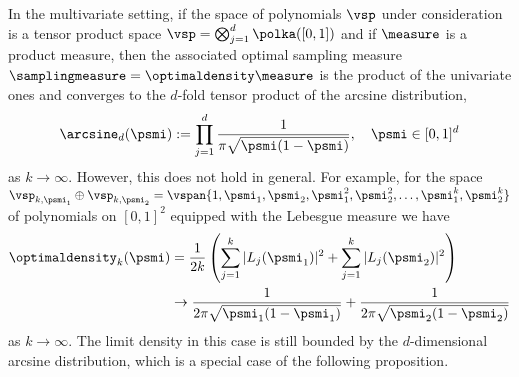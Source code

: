 In the multivariate setting, if the space of polynomials $\vsp$ under consideration is a tensor product space $\vsp=\bigotimes_{j=1}^{d}\polka([0,1])$ and if $\measure$ is a product measure, then the associated optimal sampling measure $\samplingmeasure=\optimaldensity\measure$ is the product of the univariate ones and converges to the $d$-fold tensor product of the arcsine distribution,
 \begin{equation*}
 \arcsine_{d}(\psmi):=\prod_{j=1}^{d}\frac{1}{\pi\sqrt{\psmi(1-\psmi)}},\quad \psmi\in[0,1]^d
 \end{equation*}
 as $k\to\infty$. However, this does not hold in general. For example, for the space $\vsp_{k,\psmi_1}\oplus \vsp_{k,\psmi_2}=\vspan\{1,\psmi_1,\psmi_2,\psmi_1^2,\psmi_2^2,\dots,\psmi_1^k,\psmi_2^k\}$ of polynomials on $[0,1]^2$ equipped with the Lebesgue measure we have
\begin{equation*}
\begin{split}
\optimaldensity_k(\psmi)&=\frac{1}{2k}\left(\sum_{j=1}^{k}|L_j(\psmi_1)|^2+\sum_{j=1}^{k}|L_j(\psmi_2)|^2\right)\\
&\to \frac{1}{2\pi\sqrt{\psmi_1(1-\psmi_1)}}+\frac{1}{2\pi\sqrt{\psmi_2(1-\psmi_2)}}
\end{split}
\end{equation*}
as $k\to\infty$. The limit density in this case is still bounded by the $d$-dimensional arcsine distribution, which is a special case of the following proposition.

